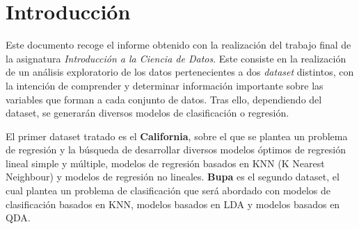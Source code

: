 \chapter{Introducción}
Este documento recoge el informe obtenido con la realización del trabajo final de la asignatura \textit{Introducción a la Ciencia de Datos}. Este consiste en la realización de un análisis exploratorio de los datos pertenecientes a dos \textit{dataset} distintos, con la intención de comprender y determinar información importante sobre las variables que forman a cada conjunto de datos. Tras ello, dependiendo del dataset, se generarán diversos modelos de clasificación o regresión.

\vspace{0.5cm}
El primer dataset tratado es el \textbf{California}, sobre el que se plantea un problema de regresión y la búsqueda de desarrollar diversos modelos óptimos de regresión lineal simple y múltiple, modelos de regresión basados en KNN (K Nearest Neighbour) y modelos de regresión no lineales.
\textbf{Bupa} es el segundo dataset, el cual plantea un problema de clasificación que será abordado con modelos de clasificación basados en KNN, modelos basados en LDA y modelos basados en QDA.

